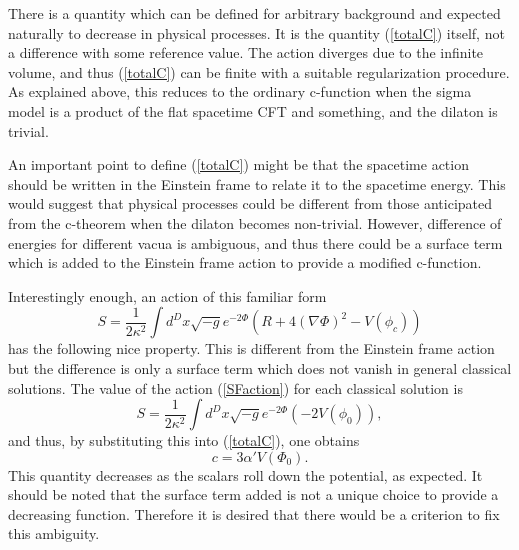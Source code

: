\documentclass[a4paper,a4paper]{article}
\begin{document}
\vspace{3mm}

There is a quantity which can be defined for arbitrary background and expected naturally to decrease in physical 
processes. 
It is the quantity (\ref{totalC}) itself, not a difference with some reference value. 
The action diverges due to the infinite volume, and thus (\ref{totalC}) can be finite with a suitable 
regularization procedure. 
As explained above, this reduces to the ordinary c-function when the sigma model is a product of the flat 
spacetime CFT and something, and the dilaton is trivial. 

An important point to define (\ref{totalC}) might be that the spacetime action should be written in the Einstein 
frame to relate it to the spacetime energy. 
This would suggest that physical processes could be different from those anticipated from the c-theorem when the 
dilaton becomes non-trivial. 
However, difference of energies for different vacua is ambiguous, and thus there could be a surface term which 
is added to the Einstein frame action to provide a modified c-function. 

Interestingly enough, an action of this familiar form 
\begin{equation}
S = \frac1{2\kappa^2}\int d^Dx\sqrt{-g}e^{-2\Phi}(R+4(\nabla\Phi)^2-V(\phi_c))
    \label{SFaction}
\end{equation}
has the following nice property. 
This is different from the Einstein frame action but the difference is only a surface term which does not vanish in 
general classical solutions. 
The value of the action (\ref{SFaction}) for each classical solution is 
\begin{equation}
S = \frac1{2\kappa^2}\int d^Dx\sqrt{-g}e^{-2\Phi}(-2V(\phi_0)),
\end{equation}
and thus, by substituting this into (\ref{totalC}), one obtains 
\begin{equation}
c = 3\alpha'V(\Phi_0).
\end{equation}
This quantity decreases as the scalars roll down the potential, as expected. 
It should be noted that the surface term added is not a unique choice to provide a decreasing function. 
Therefore it is desired that there would be a criterion to fix this ambiguity. 
\end{document}
